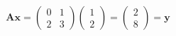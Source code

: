 \documentclass{scrartcl}
\begin{document}
\[
    \boldsymbol{A}\boldsymbol{x} = 
        \begin{pmatrix}
            0 & 1\\
            2 & 3
        \end{pmatrix}
        \begin{pmatrix}
            1\\
            2
        \end{pmatrix}
    = \begin{pmatrix}
        2\\
        8
    \end{pmatrix}
    = \boldsymbol{y}
\]
\end{document}
